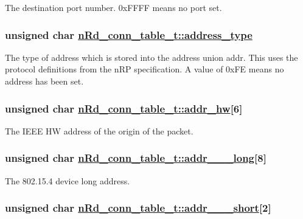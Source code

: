 The destination port number. 0x\-FFFF means no port set. \hypertarget{structnRd__conn__table__t_f6751f67d1c85517fe6f930da3479fec}{
\subsubsection[address\_\-type]{\setlength{\rightskip}{0pt plus 5cm}unsigned char \hyperlink{structnRd__conn__table__t_f6751f67d1c85517fe6f930da3479fec}{n\-Rd\_\-conn\_\-table\_\-t::address\_\-type}}}
\label{structnRd__conn__table__t_f6751f67d1c85517fe6f930da3479fec}


The type of address which is stored into the address union addr. This uses the protocol definitions from the n\-RP specification. A value of 0x\-FE means no address has been set. \hypertarget{structnRd__conn__table__t_ff09c033c2910e672f3f89c6110a8695}{
\subsubsection[addr\_\-hw]{\setlength{\rightskip}{0pt plus 5cm}unsigned char \hyperlink{structnRd__conn__table__t_ff09c033c2910e672f3f89c6110a8695}{n\-Rd\_\-conn\_\-table\_\-t::addr\_\-hw}\mbox{[}6\mbox{]}}}
\label{structnRd__conn__table__t_ff09c033c2910e672f3f89c6110a8695}


The IEEE HW address of the origin of the packet. \hypertarget{structnRd__conn__table__t_6c297e055b95f2789f00e341e5aef58e}{
\subsubsection[addr\_\-15\_\-4\_\-long]{\setlength{\rightskip}{0pt plus 5cm}unsigned char \hyperlink{structnRd__conn__table__t_6c297e055b95f2789f00e341e5aef58e}{n\-Rd\_\-conn\_\-table\_\-t::addr\_\_\_\-long}\mbox{[}8\mbox{]}}}
\label{structnRd__conn__table__t_6c297e055b95f2789f00e341e5aef58e}


The 802.15.4 device long address. \hypertarget{structnRd__conn__table__t_b92003a2d27148c501eee1a5d3e1f1a1}{
\subsubsection[addr\_\-15\_\-4\_\-short]{\setlength{\rightskip}{0pt plus 5cm}unsigned char \hyperlink{structnRd__conn__table__t_b92003a2d27148c501eee1a5d3e1f1a1}{n\-Rd\_\-conn\_\-table\_\-t::addr\_\_\_\-short}\mbox{[}2\mbox{]}}}
\label{structnRd__conn__table__t_b92003a2d27148c501eee1a5d3e1f1a1}


